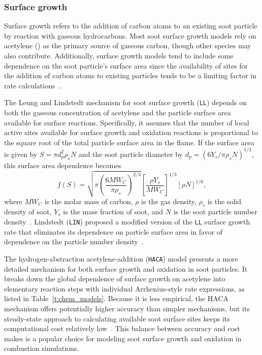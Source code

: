 \documentclass[preprint,letterpaper]{elsarticle}
\begin{document}
\subsubsection{Surface growth}
\label{sss:grw}

Surface growth refers to the addition of carbon atoms to an existing soot particle by reaction with gaseous hydrocarbons. Most soot surface growth models rely on acetylene () as the primary source of gaseous carbon, though other species may also contribute. Additionally, surface growth models tend to include some dependence on the soot particle's surface area since the availability of sites for the addition of carbon atoms to existing particles tends to be a limiting factor in rate calculations~\cite{Wang_2011}.

The Leung and Lindstedt mechanism for soot surface growth (\texttt{LL}) depends on both the gaseous concentration of acetylene and the particle surface area available for surface reactions. Specifically, it assumes that the number of local active sites available for surface growth and oxidation reactions is proportional to the square root of the total particle surface area in the flame. If the surface area is given by $S=\pi d_p^2 \rho_s N$ and the soot particle diameter by $d_p=(6Y_{s}/\pi \rho_{s} N)^{1/3}$, this surface area dependence becomes
\begin{equation}
    \label{e:surface_area}
    f(S) = \sqrt{\pi \left( \frac{6MW_C}{\pi \rho_{s}} \right) ^{2/3}} \left[ \frac{\rho Y_{s}}{MW_C} \right]^{1/3} [\rho N]^{1/6},
\end{equation}
where $MW_C$ is the molar mass of carbon, $\rho$ is the gas density, $\rho_{s}$ is the solid density of soot, $Y_{s}$ is the mass fraction of soot, and $N$ is the soot particle number density~\cite{Leung_1991}. Lindstedt (\texttt{LIN}) proposed a modified version of the \texttt{LL} surface growth rate that eliminates its dependence on particle surface area in favor of dependence on the particle number density~\cite{Lindstedt_1994}.

The hydrogen-abstraction acetylene-addition (\texttt{HACA}) model presents a more detailed mechanism for both surface growth and oxidation in soot particles. It breaks down the global dependence of surface growth on acetylene into elementary reaction steps with individual Arrhenius-style rate expressions, as listed in Table~\ref{t:chem_models}. Because it is less empirical, the HACA mechanism offers potentially higher accuracy than simpler mechanisms, but its steady-state approach to calculating available soot surface sites keeps its computational cost relatively low~\cite{Appel_2000}. This balance between accuracy and cost makes is a popular choice for modeling soot surface growth and oxidation in combustion simulations.
\end{document}
